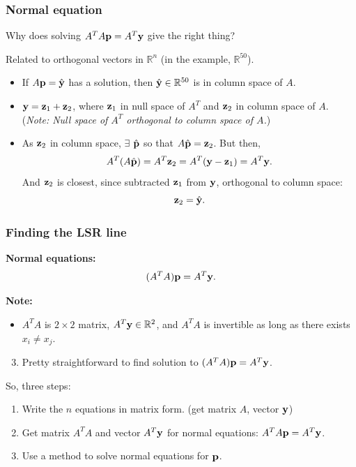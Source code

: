 \documentclass{beamer}
\theoremstyle{example}
\begin{document}
\begin{frame}
\frametitle{Normal equation}
Why does solving $A^TA{\bf p} = A^T{\bf y}$ give the right thing?
\vspace*{12pt}

\pause
Related to orthogonal vectors in $\mathbb R^n$ (in the example, $\mathbb R^{50}$).

\begin{itemize}
    \item If $A{\bf p} = \hat{\bf y}$ has a solution, then $\hat{\bf y}\in\mathbb R^{50}$ is in column space of $A$.
    \pause
    \item ${\bf y} = {\bf z}_1 + {\bf z}_2$, where ${\bf z}_1$ in null space of $A^T$ and ${\bf z}_2$ in column space of $A$.\newline 
    \qquad (\emph{Note: Null space of $A^T$ orthogonal to column space of $A$.})
    \pause
    \item As ${\bf z}_2$ in column space, $\exists$ $\hat{\bf p}$ so that $A\hat{\bf p} = {\bf z}_2$.\pause \hspace*{0.5em}
    But then, 
    \[A^T(A\hat{\bf p}) = A^T{\bf z}_2 = A^T({\bf y} - {\bf z}_1) = A^T{\bf y}.\]
    And ${\bf z}_2$ is closest, since subtracted ${\bf z}_1$ from ${\bf y}$, orthogonal to column space: \newline 
    \[{\bf z}_2 = \hat{\bf y}.\]
\end{itemize}

\end{frame}

\begin{frame}
\frametitle{Finding the LSR line}
\textbf{Normal equations:} 
\[(A^TA){\bf p} = A^T{\bf y}.\]

\pause
\textbf{Note:}
\begin{itemize}
    \item $A^TA$ is $2\times 2$ matrix, $A^T{\bf y}\in\mathbb R^2$, and $A^TA$ is invertible as long as there exists $x_i\ne x_j$.
\end{itemize}

\pause 
\begin{enumerate}
\setcounter{enumi}{2}
    \item Pretty straightforward to find solution to $(A^TA){\bf p} = A^T{\bf y}$.
\end{enumerate}

\pause 
So, three steps: 
\begin{enumerate}
    \item Write the $n$ equations in matrix form. (get matrix $A$, vector ${\bf y}$)
    \item Get matrix $A^TA$ and vector $A^T{\bf y}$ for normal equations: \mbox{$A^TA{\bf p} = A^T{\bf y}$.}
    \item Use a method to solve normal equations for ${\bf p}$.
\end{enumerate}
\end{frame}
\end{document}
